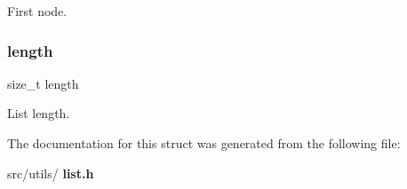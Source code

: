 First node. \mbox{\label{structlist_ae809d5359ac030c60a30a8f0b2294b82}} 
\subsubsection{length}
{\footnotesize\ttfamily size\+\_\+t length}

List length. 

The documentation for this struct was generated from the following file\+:\begin{DoxyCompactItemize}
\item 
src/utils/\textbf{ list.\+h}\end{DoxyCompactItemize}
